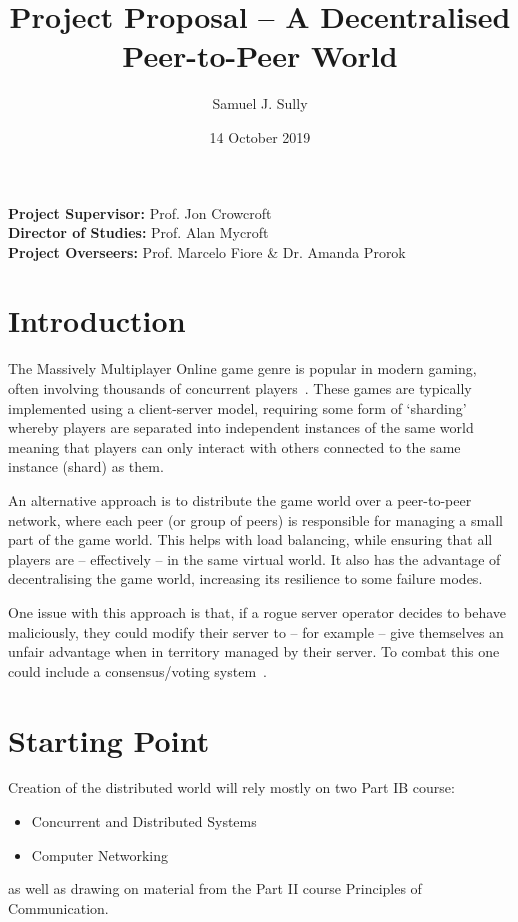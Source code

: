 \documentclass[12pt,a4paper]{article}
\begin{document}
	\title{Project Proposal -- A Decentralised Peer-to-Peer World}
	\author{Samuel J. Sully}
	\date{14 October 2019}
	\maketitle
	\thispagestyle{empty}
	
	\noindent
	\textbf{Project Supervisor:} Prof. Jon Crowcroft\\
	\textbf{Director of Studies:} Prof. Alan Mycroft\\
	\textbf{Project Overseers:} Prof. Marcelo Fiore \&  Dr. Amanda Prorok

	\section{Introduction}
	
	The Massively Multiplayer Online game genre is popular in modern gaming, often involving thousands of concurrent players~\cite{wowstat}. These games are typically implemented using a client-server model, requiring some form of `sharding'~\cite{shard} whereby players are separated into independent instances of the same world meaning that players can only interact with others connected to the same instance (shard) as them.
	
	An alternative approach is to distribute the game world over a peer-to-peer network, where each peer (or group of peers) is responsible for managing a small part of the game world. This helps with load balancing, while ensuring that all players are -- effectively -- in the same virtual world. It also has the advantage of decentralising the game world, increasing its resilience to some failure modes.
	
	One issue with this approach is that, if a rogue server operator decides to behave maliciously, they could modify their server to -- for example -- give themselves an unfair advantage when in territory managed by their server. To combat this one could include a consensus/voting system~\cite{peerreview}.
	
	\section{Starting Point}
	
	Creation of the distributed world will rely mostly on two Part IB course:
	\begin{itemize}
		\item Concurrent and Distributed Systems
		\item Computer Networking
	\end{itemize}
	as well as drawing on material from the Part II course Principles of Communication.
	
\end{document}
